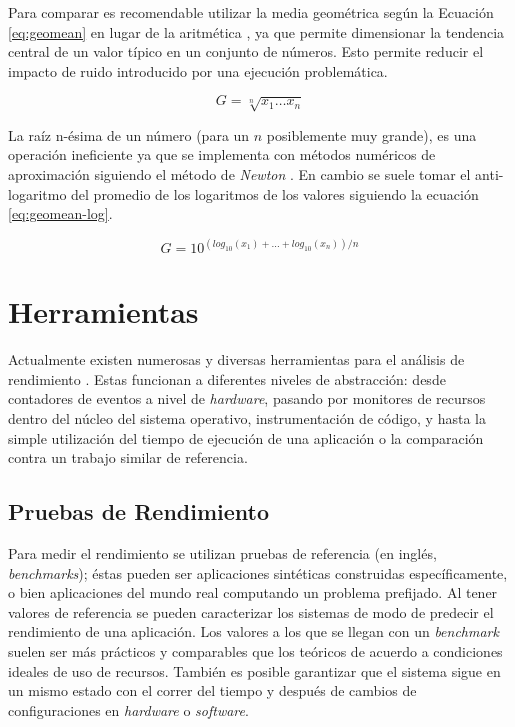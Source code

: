 \documentclass[a4paper]{report}
\begin{document}
\bigskip

Para comparar es recomendable utilizar la media geométrica según la Ecuación \ref{eq:geomean} en lugar de la aritmética \cite{how-not-to-lie}, ya que permite dimensionar la tendencia central de un valor típico en un conjunto de números. Esto permite reducir el impacto de ruido introducido por una ejecución problemática.

\begin{equation}
\label{eq:geomean}
G = \sqrt[n]{x_{1} \ldots x_{n}}
\end{equation}

La raíz n-ésima de un número (para un $ n $ posiblemente muy grande), es una operación ineficiente ya que se implementa con métodos numéricos de aproximación siguiendo el método de {\it Newton} \cite{numerical-analysis}. En cambio se suele tomar el anti-logaritmo del promedio de los logaritmos de los valores siguiendo la ecuación \ref{eq:geomean-log}.

\begin{equation}
\label{eq:geomean-log}
G = 10 ^{( log _{10} (x_{1}) + \ldots + log _{10} (x_{n}) ) / n}
\end{equation}

\section{Herramientas}

Actualmente existen numerosas y diversas herramientas para el análisis de rendimiento \cite{gregg}. Estas funcionan a diferentes niveles de abstracción: desde contadores de eventos a nivel de {\it hardware}, pasando por monitores de recursos dentro del núcleo del sistema operativo, instrumentación de código, y hasta la simple utilización del tiempo de ejecución de una aplicación o la comparación contra un trabajo similar de referencia. 

\subsection{Pruebas de Rendimiento}

Para medir el rendimiento se utilizan pruebas de referencia (en inglés, {\em benchmarks}); éstas pueden ser aplicaciones sintéticas construidas específicamente, o bien aplicaciones del mundo real computando un problema prefijado. Al tener valores de referencia se pueden caracterizar los sistemas de modo de predecir el rendimiento de una aplicación.
Los valores a los que se llegan con un {\it benchmark} suelen ser más prácticos y
comparables que los teóricos de acuerdo a condiciones ideales de uso de recursos.
También es posible garantizar que el sistema sigue en un mismo estado con el correr
del tiempo y después de cambios de configuraciones en {\it hardware} o {\it software}.
\end{document}
